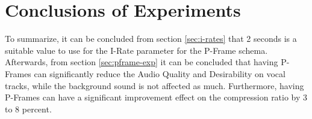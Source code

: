 \section{Conclusions of Experiments} 


To summarize, it can be concluded from section \ref{sec:i-rates} that 2 seconds is a suitable value to use for the I-Rate parameter for the P-Frame schema. Afterwards, from section \ref{sec:pframe-exp} it can be concluded that having P-Frames can significantly reduce the Audio Quality and Desirability on vocal tracks, while the background sound is not affected as much. Furthermore, having P-Frames can have a significant improvement effect on the compression ratio by 3 to 8 percent.